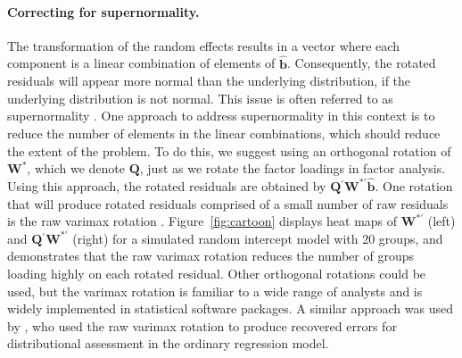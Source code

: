 \documentclass[12pt]{article} %
\newcommand{\hh}[1]{{\color{orange} #1}}
\newcommand{\al}[1]{{\color{red} #1}}
\newcommand{\trans}{\ensuremath{^\prime}}
\begin{document}
{\paragraph{Correcting for supernormality.}
The transformation of the random effects results in a vector where each component is a linear combination of elements of $\widehat{\bm{b}}$. Consequently, the rotated residuals will appear more normal than the underlying distribution, if the underlying distribution is not normal. This issue is often referred to as supernormality \citep{Atkinson:1985}. One approach to address supernormality in this context is to reduce the number of elements in the linear combinations, which should reduce the extent of the problem. To do this, we suggest using an orthogonal rotation of $\bm{W}^*$, which we denote $\bm{Q}$, just as we rotate the factor loadings in factor analysis. Using this approach, the rotated residuals are obtained by $\bm{Q}\trans \bm{W}^{*\prime} \widehat{\bm{b}}$. One rotation that will produce rotated residuals comprised of a small number of raw residuals is the raw varimax rotation \citep{Johnson:2007}. Figure~\ref{fig:cartoon} displays heat maps of $\bm{W}^{*\prime}$ (left) and $\bm{Q}\trans\bm{W}^{*\prime}$ (right) for a simulated random intercept model with 20 groups, and demonstrates that the raw varimax rotation reduces the number of groups loading highly on each rotated residual. %
Other orthogonal rotations could be used, but the varimax rotation is familiar to a wide range of analysts and is widely implemented in statistical software packages. A similar approach was used by \cite{Jensen:1999iu}, who used the raw varimax rotation to produce recovered errors for distributional assessment in the ordinary regression model.

}
\end{document}
